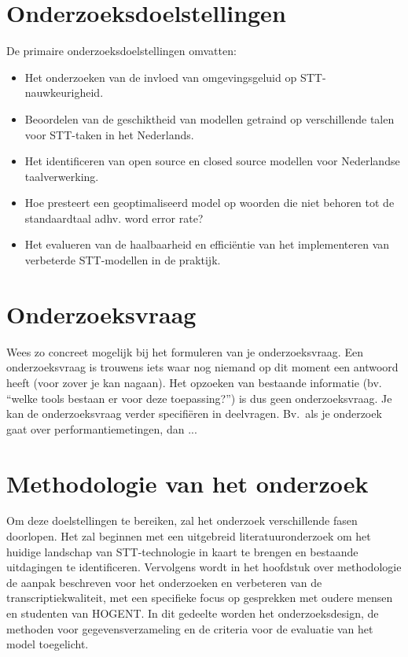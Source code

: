 \section{Onderzoeksdoelstellingen}

De primaire onderzoeksdoelstellingen omvatten:

\begin{itemize}
    \item Het onderzoeken van de invloed van omgevingsgeluid op STT-nauwkeurigheid.
    \item Beoordelen van de geschiktheid van modellen getraind op verschillende talen voor STT-taken in het Nederlands.
    \item Het identificeren van open source en closed source modellen voor Nederlandse taalverwerking.
    \item Hoe presteert een geoptimaliseerd model op woorden die niet behoren tot de standaardtaal adhv. word error rate?
    \item Het evalueren van de haalbaarheid en efficiëntie van het implementeren van verbeterde STT-modellen in de praktijk.
\end{itemize}

\section{Onderzoeksvraag}
Wees zo concreet mogelijk bij het formuleren van je onderzoeksvraag. Een onderzoeksvraag is trouwens iets waar nog niemand op dit moment een antwoord heeft (voor zover je kan nagaan). Het opzoeken van bestaande informatie (bv. ``welke tools bestaan er voor deze toepassing?'') is dus geen onderzoeksvraag. Je kan de onderzoeksvraag verder specifiëren in deelvragen. Bv.~als je onderzoek gaat over performantiemetingen, dan ...

\section{Methodologie van het onderzoek}
Om deze doelstellingen te bereiken, zal het onderzoek verschillende fasen doorlopen. Het zal beginnen met een uitgebreid literatuuronderzoek om het huidige landschap van STT-technologie in kaart te brengen en bestaande uitdagingen te identificeren. Vervolgens wordt in het hoofdstuk over methodologie de aanpak beschreven voor het onderzoeken en verbeteren van de transcriptiekwaliteit, met een specifieke focus op gesprekken met oudere mensen en studenten van HOGENT. In dit gedeelte worden het onderzoeksdesign, de methoden voor gegevensverzameling en de criteria voor de evaluatie van het model toegelicht.

